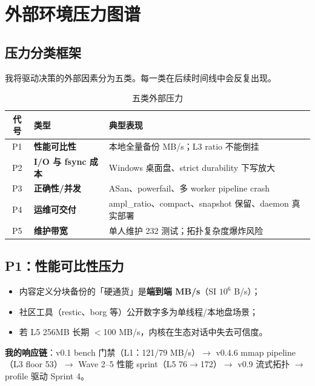 \chapter{外部环境压力图谱}
\label{ch:pressures}

\section{压力分类框架}

我将驱动决策的外部因素分为五类。每一类在后续时间线中会反复出现。

\begin{table}[htbp]
\centering
\caption{五类外部压力}
\small
\begin{tabular}{@{}clp{6.8cm}@{}}
\toprule
代号 & 类型 & 典型表现 \\
\midrule
P1 & \textbf{性能可比性} & 本地全量备份 MB/s；L3 ratio 不能倒挂 \\
P2 & \textbf{I/O 与 fsync 成本} & Windows 桌面盘、strict durability 下写放大 \\
P3 & \textbf{正确性/并发} & ASan、powerfail、多 worker pipeline crash \\
P4 & \textbf{运维可交付} & ampl\_ratio、compact、snapshot 保留、daemon 真实部署 \\
P5 & \textbf{维护带宽} & 单人维护 232 测试；拓扑复杂度爆炸风险 \\
\bottomrule
\end{tabular}
\end{table}

\section{P1：性能可比性压力}

\begin{pressbox}[压力来源]
\begin{itemize}[nosep]
  \item 内容定义分块备份的「硬通货」是\textbf{端到端 MB/s}（SI $10^6$ B/s）；
  \item 社区工具（restic、borg 等）公开数字多为单线程/本地盘场景；
  \item 若 L5 256MB 长期 $<$100 MB/s，内核在生态对话中失去可信度。
\end{itemize}
\end{pressbox}

\textbf{我的响应链}：v0.1 bench 门禁（L1：121/79 MB/s）$\rightarrow$ v0.4.6 mmap pipeline（L3 floor 53）$\rightarrow$ Wave 2--5 性能 sprint（L5 76$\rightarrow$172）$\rightarrow$ v0.9 流式拓扑 $\rightarrow$ profile 驱动 Sprint 4。

